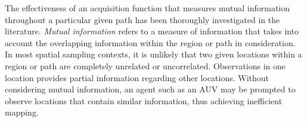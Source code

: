 			The effectiveness of an acquisition function that measures mutual information throughout a particular given path has been thoroughly investigated in the literature. \textit{Mutual information} refers to a measure of information that takes into account the overlapping information within the region or path in consideration. In most spatial sampling contexts, it is unlikely that two given locations within a region or path are completely unrelated or uncorrelated. Observations in one location provides partial information regarding other locations. Without considering mutual information, an agent such as an AUV may be prompted to observe locations that contain similar information, thus achieving inefficient mapping. %
			
